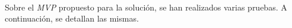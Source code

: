 \documentclass[../../memoria.tex]{subfiles}
\begin{document}
\paragraph{}
Sobre el \textit{MVP} propuesto para la solución, se han realizados varias pruebas. A continuación, se detallan las mismas.
\end{document}
